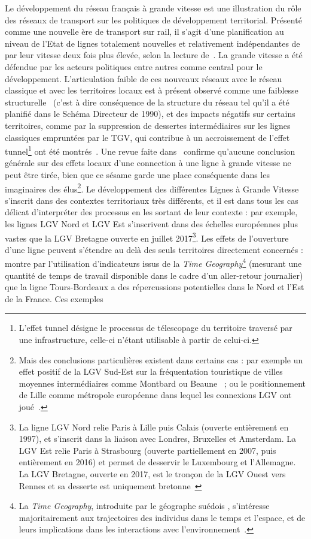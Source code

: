 {Le développement du réseau français à grande vitesse est une illustration du rôle des réseaux de transport sur les politiques de développement territorial. Présenté comme une nouvelle ère de transport sur rail, il s'agit d'une planification au niveau de l'Etat de lignes totalement nouvelles et relativement indépendantes de par leur vitesse deux fois plus élevée, selon la lecture de~\cite{zembri1997fondements}. La grande vitesse a été défendue par les acteurs politiques entre autres comme central pour le développement. L'articulation faible de ces nouveaux réseaux avec le réseau classique et avec les territoires locaux est à présent observé comme une faiblesse structurelle~\cite{zembri1997fondements} (c'est à dire conséquence de la structure du réseau tel qu'il a été planifié dans le Schéma Directeur de 1990), et des impacts négatifs sur certains territoires, comme par la suppression de dessertes intermédiaires sur les lignes classiques empruntées par le TGV, qui contribue à un accroissement de l'effet tunnel\footnote{L'effet tunnel désigne le processus de télescopage du territoire traversé par une infrastructure, celle-ci n'étant utilisable à partir de celui-ci.} ont été montrés~\cite{zembri2008contribution}. Une revue faite dans~\cite{bazin2011grande} confirme qu'aucune conclusion générale sur des effets locaux d'une connection à une ligne à grande vitesse ne peut être tirée, bien que ce sésame garde une place conséquente dans les imaginaires des élus\footnote{Mais des conclusions particulières existent dans certains cas : par exemple un effet positif de la LGV Sud-Est sur la fréquentation touristique de villes moyennes intermédiaires comme Montbard ou Beaune~\cite{bonnafous1987regional} ; ou le positionnement de Lille comme métropole européenne dans lequel les connexions LGV ont joué~\cite{giblin2004lille}.}. Le développement des différentes Lignes à Grande Vitesse s'inscrit dans des contextes territoriaux très différents, et il est dans tous les cas délicat d'interpréter des processus en les sortant de leur contexte : par exemple, les lignes LGV Nord et LGV Est s'inscrivent dans des échelles européennes plus vastes que la LGV Bretagne ouverte en juillet 2017\footnote{La ligne LGV Nord relie Paris à Lille puis Calais (ouverte entièrement en 1997), et s'inscrit dans la liaison avec Londres, Bruxelles et Amsterdam. La LGV Est relie Paris à Strasbourg (ouverte partiellement en 2007, puis entièrement en 2016) et permet de desservir le Luxembourg et l'Allemagne. La LGV Bretagne, ouverte en 2017, est le tronçon de la LGV Ouest vers Rennes et sa desserte est uniquement bretonne~\cite{zembri2010new}}. Les effets de l'ouverture d'une ligne peuvent s'étendre au delà des seuls territoires directement concernés : \cite{l2014contribution} montre par l'utilisation d'indicateurs issus de la \emph{Time Geography}\footnote{La \emph{Time Geography}, introduite par le géographe suédois , s'intéresse majoritairement aux trajectoires des individus dans le temps et l'espace, et de leurs implications dans les interactions avec l'environnement~\cite{chardonnel2007time}.} (mesurant une quantité de temps de travail disponible dans le cadre d'un aller-retour journalier) que la ligne Tours-Bordeaux a des répercussions potentielles dans le Nord et l'Est de la France. Ces exemples }
